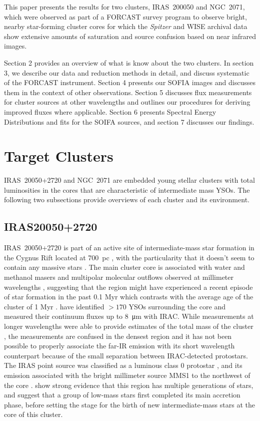 This paper presents the results for two clusters, IRAS~200050
and NGC~2071, which were observed as part of a FORCAST survey program to observe bright, nearby star-forming cluster cores for which the \textit{Spitzer} and WISE archival data show extensive amounts of saturation and source confusion based on near infrared images. 

Section 2 provides an overview of what is know about the two clusters. In section 3, we describe our data and reduction methods in detail, and discuss systematic of the FORCAST instrument. Section 4 presents our SOFIA images and discusses them in the context of other observations. Section 5 discusses flux measurements for cluster sources at other wavelengths and outlines our procedures for deriving improved fluxes where applicable. Section 6 presents Spectral Energy Distributions and fits for the SOIFA sources, and section 7 discusses our findings.

\section{Target Clusters}
IRAS~20050+2720 and NGC~2071 are embedded young stellar clusters with total luminosities in the cores that are characteristic of intermediate mass YSOs. The following two subsections provide overviews of each cluster and its environment.

\subsection{IRAS20050+2720}

IRAS~20050+2720 is part of an active site of intermediate-mass star formation in the Cygnus Rift located at 700~pc \citep{Wilking:1989el}, with the particularity that it doesn't seem to contain any massive stars \citep{Gunther:2012dq}. The main cluster core is associated with water and methanol masers \citep{Palla:1991up,Fontani:2010cf} and multipolar molecular outflows observed at millimeter wavelengths \citep{Bachiller:1995cy,Anglada:1998uu,Beltran:2008gu}, suggesting that the region might have experienced a recent episode of star formation in the past 0.1 Myr which contrasts with the average age of the cluster of 1 Myr \citep{Chen:1997tb,Gutermuth:2005hx}. \cite{Gutermuth:2009gca} have identified $>170$ YSOs surrounding the core and measured their continuum fluxes up to \SI{8}{\micro\meter} with IRAC. While measurements at longer wavelengths were able to provide estimates of the total mass of the cluster \citep[e.g. using IRAS,][388~$L_\odot$]{Molinari:1996td}, the measurements are confused in the densest region and it has not been possible to properly associate the far-IR emission with its short wavelength counterpart because of the small separation between IRAC-detected protostars. The IRAS point source was classified as a luminous class 0 protostar \citep{Bachiller:1996ja}, and its emission associated with the bright millimeter source MMS1 to the northwest of the core \citep{Chini:2001fa}. \cite{Beltran:2008gu} show strong evidence that this region has multiple generations of stars, and suggest that a group of low-mass stars first completed its main accretion phase, before setting the stage for the birth of new intermediate-mass stars at the core of this cluster.

